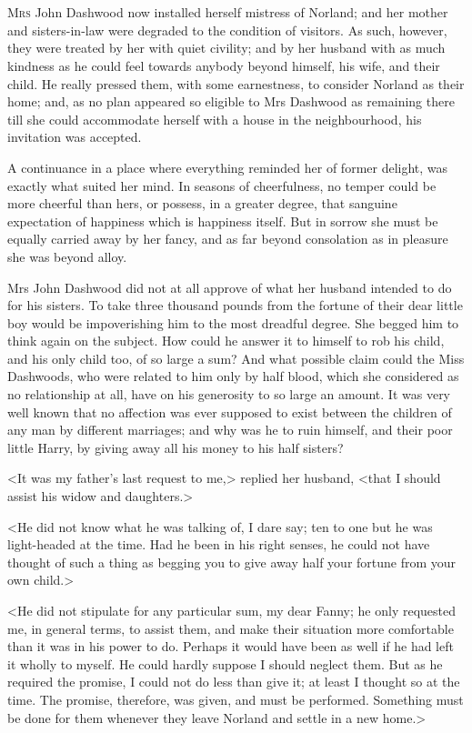 \chapter[Chapter \thechapter]{}
\lettrine[lraise=0.3]{M}{rs} John Dashwood now installed herself mistress of Norland; and her mother and sisters-in-law were degraded to the condition of visitors. As such, however, they were treated by her with quiet civility; and by her husband with as much kindness as he could feel towards anybody beyond himself, his wife, and their child. He really pressed them, with some earnestness, to consider Norland as their home; and, as no plan appeared so eligible to Mrs Dashwood as remaining there till she could accommodate herself with a house in the neighbourhood, his invitation was accepted.

A continuance in a place where everything reminded her of former delight, was exactly what suited her mind. In seasons of cheerfulness, no temper could be more cheerful than hers, or possess, in a greater degree, that sanguine expectation of happiness which is happiness itself. But in sorrow she must be equally carried away by her fancy, and as far beyond consolation as in pleasure she was beyond alloy.

Mrs John Dashwood did not at all approve of what her husband intended to do for his sisters. To take three thousand pounds from the fortune of their dear little boy would be impoverishing him to the most dreadful degree. She begged him to think again on the subject. How could he answer it to himself to rob his child, and his only child too, of so large a sum? And what possible claim could the Miss Dashwoods, who were related to him only by half blood, which she considered as no relationship at all, have on his generosity to so large an amount. It was very well known that no affection was ever supposed to exist between the children of any man by different marriages; and why was he to ruin himself, and their poor little Harry, by giving away all his money to his half sisters?

<It was my father's last request to me,> replied her husband, <that I should assist his widow and daughters.>

<He did not know what he was talking of, I dare say; ten to one but he was light-headed at the time. Had he been in his right senses, he could not have thought of such a thing as begging you to give away half your fortune from your own child.>

<He did not stipulate for any particular sum, my dear Fanny; he only requested me, in general terms, to assist them, and make their situation more comfortable than it was in his power to do. Perhaps it would have been as well if he had left it wholly to myself. He could hardly suppose I should neglect them. But as he required the promise, I could not do less than give it; at least I thought so at the time. The promise, therefore, was given, and must be performed. Something must be done for them whenever they leave Norland and settle in a new home.>

